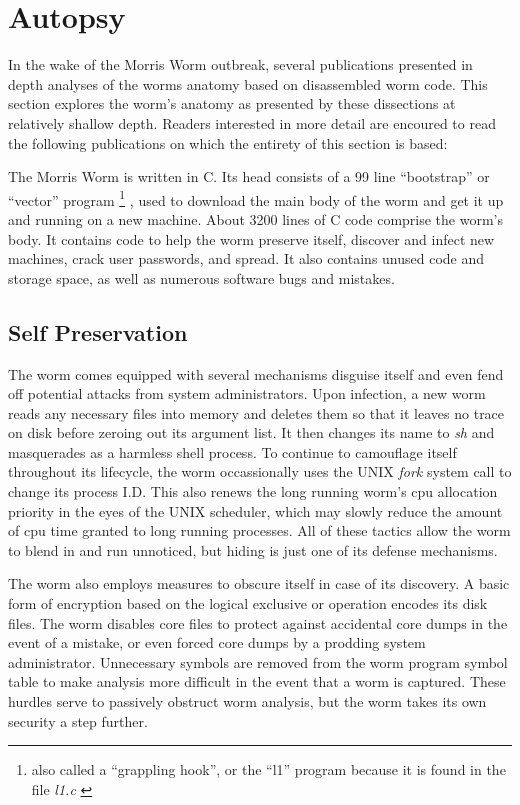 \section*{Autopsy}
In the wake of the Morris Worm outbreak, several
publications presented in depth analyses of the worms
anatomy based on disassembled worm code. This section explores the worm's
anatomy as presented by these dissections at relatively shallow depth. Readers interested
in more detail are encoured to read the following publications on which the
entirety of this section is based: 
\cite{seeley_tour_1989}
\cite{spafford_crisis_1989}
\cite{spafford_internet_1989}
\cite{eichin_microscope_1989}

The Morris Worm is written in C. Its head consists of a 99 line ``bootstrap''
or ``vector'' program
\footnote{
also called a ``grappling hook'', or the ``l1'' program because it is found in 
the file \textit{l1.c} \cite{spafford_crisis_1989}
}
, used to download the main body of the worm and get it up
and running on a new machine. About 3200 lines of C code comprise the worm's
body. It contains code to help the worm preserve itself, discover and infect
new machines, crack user passwords, and spread. It also contains unused code
and storage space, as well as
numerous software bugs and mistakes.


\subsection*{Self Preservation}
The worm comes equipped with several mechanisms disguise itself and even fend
off potential attacks from system administrators. Upon infection, a new worm
reads any necessary files into memory and deletes them so that it leaves no
trace on disk before zeroing out its argument list. It then changes its name to
\textit{sh} and masquerades as a harmless shell process. To continue to
camouflage itself throughout its lifecycle, the worm occassionally uses the
UNIX \textit{fork} system call to change its process I.D. This also renews the
long running worm's cpu allocation priority in the eyes of the UNIX
scheduler, which may slowly reduce the amount of cpu time granted to long
running processes. All of these tactics allow the worm to blend in and run
unnoticed, but hiding is just one of its defense mechanisms.

The worm also employs measures to obscure itself in case of its discovery. A
basic form of encryption based on the logical exclusive or operation
encodes its disk files. The worm disables core files to protect against
accidental core dumps in the event of a mistake, or even forced core dumps by a
prodding system administrator. Unnecessary symbols are removed from the worm
program symbol table to make analysis more difficult in the event that a worm is
captured. These hurdles serve to passively obstruct worm analysis, but the worm
takes its own security a step further.

